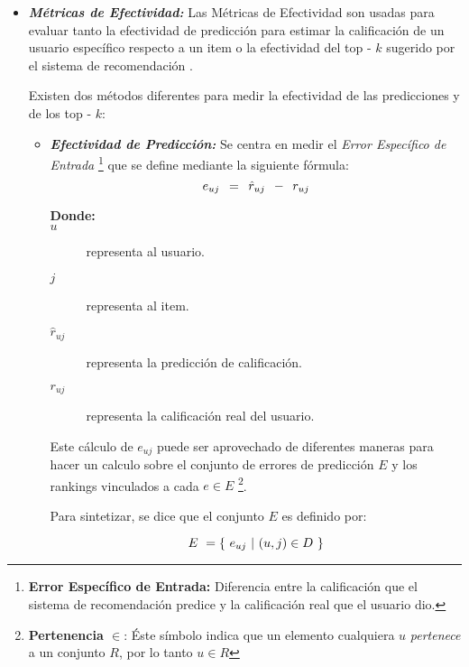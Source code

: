     \begin{itemize}
        \item \textbf{\textit{Métricas de Efectividad: }} Las Métricas de Efectividad son usadas para evaluar tanto la efectividad de predicción para estimar la calificación de un usuario específico respecto a un item o la efectividad del top - $k$ sugerido por el sistema de recomendación \parencite{Aggarwal2016}.
        
        Existen dos métodos diferentes para medir la efectividad de las predicciones y de los top - $k$:

        \begin{itemize}[label=$\diamond$]
            \item \textbf{\emph{Efectividad de Predicción: }} Se centra en medir el \textit{Error Específico de Entrada} \footnote{\textbf{Error Específico de Entrada: } Diferencia entre la calificación que el sistema de recomendación predice y la calificación real que el usuario dio.} que se define mediante la siguiente fórmula:
            \begin{equation}
                \Large e_{uj} \ = \ \hat{r}_{uj} \ - \ r_{uj}
            \addequation{Definición de Error Específico de Entrada}
            \end{equation}

            \begin{description}
                \item[\textbf{Donde: }] 
                \item[$u$] representa al usuario.
                \item[$j$] representa al item.
                \item[$\hat{r}_{uj}$] representa la predicción de calificación.
                \item[$r_{uj}$] representa la calificación real del usuario. 
            \end{description}

            Este cálculo de $e_{uj}$ puede ser aprovechado de diferentes maneras para hacer un calculo sobre el conjunto de errores de predicción $E$ y los rankings vinculados a cada $e \in E$ \footnote{\textbf{Pertenencia $\in$}: Éste símbolo indica que un elemento cualquiera $u$ \textit{pertenece} a un conjunto $R$, por lo tanto $u \in R$}.

            Para sintetizar, se dice que el conjunto $E$ es definido por: 

            \begin{equation}
                E \ =  \{ \  e_{uj} \ |  \ (u,j) \in D \ \}
                \addequation{Definición del Conjunto de Entradas $E$}
            \end{equation}
            

\end{itemize}
\end{itemize}
